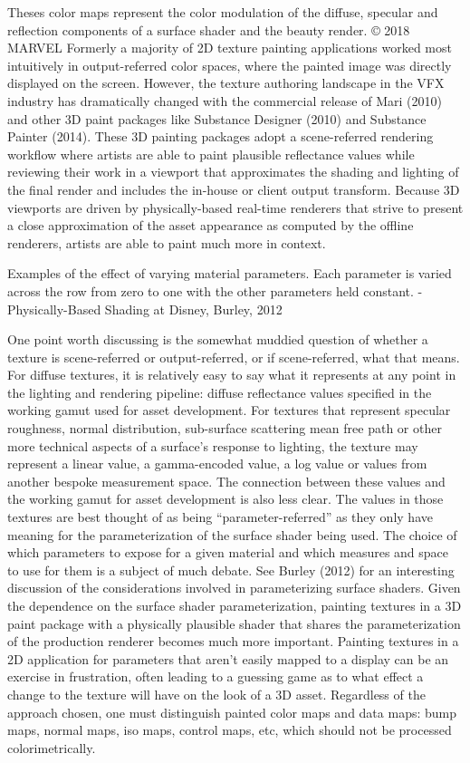 Theses color maps represent the color modulation of the diffuse, specular and reflection components of a surface shader and the beauty render.
© 2018 MARVEL
Formerly a majority of 2D texture painting applications worked most intuitively in output-referred color spaces, where the painted image was directly displayed on the screen. However, the texture authoring landscape in the VFX industry has dramatically changed with the commercial release of Mari (2010) and other 3D paint packages like Substance Designer (2010) and Substance Painter (2014). These 3D painting packages adopt a scene-referred rendering workflow where artists are able to paint plausible reflectance values while reviewing their work in a viewport that approximates the shading and lighting of the final render and includes the in-house or client output transform. Because 3D viewports are driven by physically-based real-time renderers that strive to present a close approximation of the asset appearance as computed by the offline renderers, artists are able to paint much more in context.

 Examples of the effect of varying material parameters. Each parameter is varied across the row from zero to one with the other parameters held constant. - Physically-Based Shading at Disney, Burley, 2012

One point worth discussing is the somewhat muddied question of whether a texture is scene-referred or output-referred, or if scene-referred, what that means. For diffuse textures, it is relatively easy to say what it represents at any point in the lighting and rendering pipeline: diffuse reflectance values specified in the working gamut used for asset development. For textures that represent specular roughness, normal distribution, sub-surface scattering mean free path or other more technical aspects of a surface’s response to lighting, the texture may represent a linear value, a gamma-encoded value, a log value or values from another bespoke measurement space. The connection between these values and the working gamut for asset development is also less clear. The values in those textures are best thought of as being “parameter-referred” as they only have meaning for the parameterization of the surface shader being used. The choice of which parameters to expose for a given material and which measures and space to use for them is a subject of much debate. See Burley (2012) for an interesting discussion of the considerations involved in parameterizing surface shaders. Given the dependence on the surface shader parameterization, painting textures in a 3D paint package with a physically plausible shader that shares the parameterization of the production renderer becomes much more important. Painting textures in a 2D application for parameters that aren’t easily mapped to a display can be an exercise in frustration, often leading to a guessing game as to what effect a change to the texture will have on the look of a 3D asset. Regardless of the approach chosen, one must distinguish painted color maps and data maps: bump maps, normal maps, iso maps, control maps, etc, which should not be processed colorimetrically.






